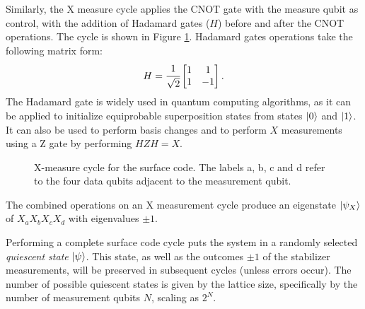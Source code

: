 Similarly, the X measure cycle applies the CNOT gate with the measure qubit as control, with the addition of Hadamard gates ($H$) before and after the CNOT operations. The cycle is shown in Figure \ref{fig:Xmeasurecycle}. Hadamard gates operations take the following matrix form:
\begin{equation}
    H=\cfrac{1}{\sqrt{2}}\begin{bmatrix}
        1&1\\
        1&-1
    \end{bmatrix}.
\end{equation}
The Hadamard gate is widely used in quantum computing algorithms, as it can be applied to initialize equiprobable superposition states from states $\ket{0}$ and $\ket{1}$. It can also be used to perform basis changes and to perform $X$ measurements using a Z gate by performing $HZH=X$.
\begin{figure}
    \centering
    \caption[X-measure cycle for the surface code]{X-measure cycle for the surface code. The labels a, b, c and d refer to the four data qubits adjacent to the measurement qubit.}
    \label{fig:Xmeasurecycle}
\end{figure}
The combined operations on an X measurement cycle produce an eigenstate $\ket{\psi_X}$ of $X_aX_bX_cX_d$ with eigenvalues $\pm 1$.

Performing a complete surface code cycle puts the system in a randomly selected \textit{quiescent state} $\ket{\psi}$. This state, as well as the outcomes $\pm 1$ of the stabilizer measurements, will be preserved in subsequent cycles (unless errors occur). The number of possible quiescent states is given by the lattice size, specifically by the number of measurement qubits $N$, scaling as $2^N$.

